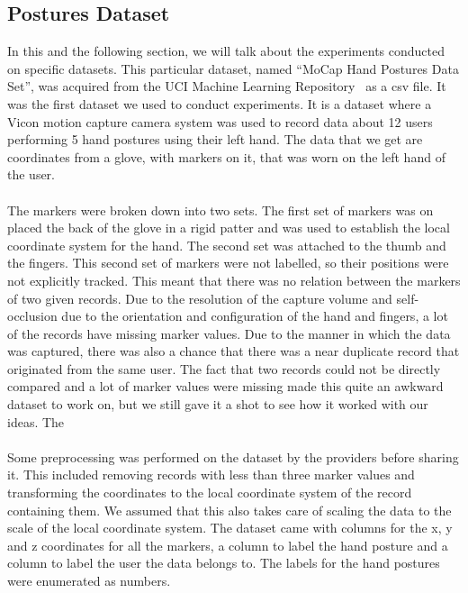 \documentclass[12pt]{article}
\begin{document}
\subsection{Postures Dataset}\label{subsec:gestureset}
In this and the following section, we will talk about the experiments conducted on specific datasets. This particular dataset, named ``MoCap Hand Postures Data Set'', was acquired from the UCI Machine Learning Repository~\cite{Dua:2019} as a csv file. It was the first dataset we used to conduct experiments. It is a dataset where a Vicon motion capture camera system was used to record data about 12 users performing 5 hand postures using their left hand. The data that we get are coordinates from a glove, with markers on it, that was worn on the left hand of the user.  
\\\\
The markers were broken down into two sets. The first set of markers was on placed the back of the glove in a rigid patter and was used to establish the local coordinate system for the hand. The second set was attached to the thumb and the fingers. This second set of markers were not labelled, so their positions were not explicitly tracked. This meant that there was no relation between the markers of two given records. Due to the resolution of the capture volume and self-occlusion due to the orientation and configuration of the hand and fingers, a lot of the records have missing marker values. Due to the manner in which the data was captured, there was also a chance that there was a near duplicate record that originated from the same user. The fact that two records could not be directly compared and a lot of marker values were missing made this quite an awkward dataset to work on, but we still gave it a shot to see how it worked with our ideas. The 
\\\\
Some preprocessing was performed on the dataset by the providers before sharing it. This included removing records with less than three marker values and transforming the coordinates to the local coordinate system of the record containing them. We assumed that this also takes care of scaling the data to the scale of the local coordinate system. The dataset came with columns for the x, y and z coordinates for all the markers, a column to label the hand posture and a column to label the user the data belongs to. The labels for the hand postures were enumerated as numbers.
\end{document}
